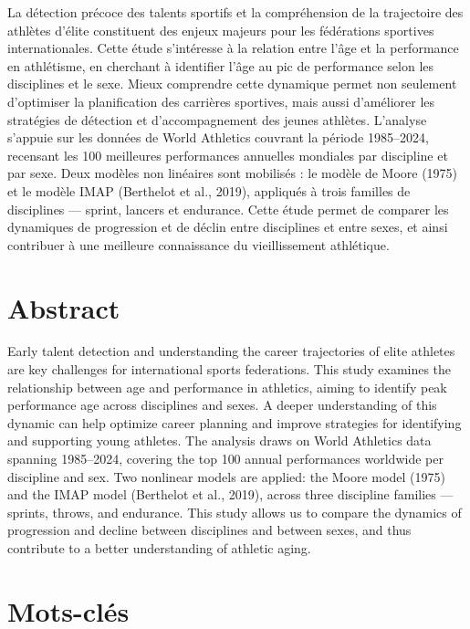 \documentclass[
  french,
  11pt,
  a4paper,
]{article}
\begin{document}
La détection précoce des talents sportifs et la compréhension de la
trajectoire des athlètes d'élite constituent des enjeux majeurs pour les
fédérations sportives internationales. Cette étude s'intéresse à la
relation entre l'âge et la performance en athlétisme, en cherchant à
identifier l'âge au pic de performance selon les disciplines et le sexe.
Mieux comprendre cette dynamique permet non seulement d'optimiser la
planification des carrières sportives, mais aussi d'améliorer les
stratégies de détection et d'accompagnement des jeunes athlètes.
L'analyse s'appuie sur les données de World Athletics couvrant la
période 1985--2024, recensant les 100 meilleures performances annuelles
mondiales par discipline et par sexe. Deux modèles non linéaires sont
mobilisés : le modèle de Moore (1975) et le modèle IMAP (Berthelot et
al., 2019), appliqués à trois familles de disciplines --- sprint,
lancers et endurance. Cette étude permet de comparer les dynamiques de
progression et de déclin entre disciplines et entre sexes, et ainsi
contribuer à une meilleure connaissance du vieillissement athlétique.

\section*{Abstract}\label{abstract}

Early talent detection and understanding the career trajectories of
elite athletes are key challenges for international sports federations.
This study examines the relationship between age and performance in
athletics, aiming to identify peak performance age across disciplines
and sexes. A deeper understanding of this dynamic can help optimize
career planning and improve strategies for identifying and supporting
young athletes. The analysis draws on World Athletics data spanning
1985--2024, covering the top 100 annual performances worldwide per
discipline and sex. Two nonlinear models are applied: the Moore model
(1975) and the IMAP model (Berthelot et al., 2019), across three
discipline families --- sprints, throws, and endurance. This study
allows us to compare the dynamics of progression and decline between
disciplines and between sexes, and thus contribute to a better
understanding of athletic aging.

\section*{Mots-clés}\label{mots-cluxe9s}
\end{document}
